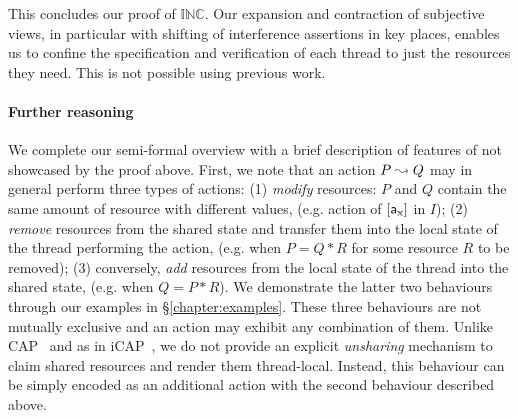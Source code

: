 This concludes our \colosl proof of $\mathbb{INC}$. Our expansion and contraction of subjective
views, in particular with shifting of interference assertions in key places, enables us to confine the specification and verification of each thread to just the resources they need. This  is not possible using previous work.
%
\paragraph{\textbf{Further \colosl reasoning}}
We complete our semi-formal overview with a brief description of features of \colosl not
showcased by the proof above. First, we note that an action $P\mathrel{\leadsto} Q$
may in general perform three types of actions: (1)
  \emph{modify} resources: $P$ and $Q$ contain the same amount of
  resource with different values, (e.g. action of $[\mathsf{a}_{\text{x}}]$ in $I$);
  (2)
  \emph{remove} resources from the shared state and transfer them into
  the local state of the thread performing the action, (e.g. when $P = Q * R$ for some resource $R$ to be removed);
  (3)
  conversely, \emph{add} resources from the local state of the thread
  into the shared state, (e.g. when $Q = P * R$).
We demonstrate the latter two behaviours through our examples in
\S\ref{chapter:examples}. These three behaviours are not mutually
exclusive and an action may exhibit any combination of them.  Unlike
CAP~\cite{cap-ecoop10} and as in iCAP~\cite{icap}, we do not provide
an explicit \emph{unsharing} mechanism to claim shared
resources and render them thread-local. Instead, this behaviour can
be simply encoded as an additional action with the second behaviour
described above.
%




